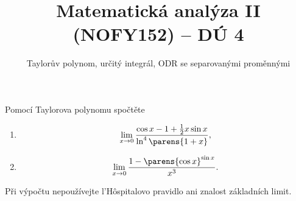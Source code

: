 \documentclass[answers]{exam}
\title{\vspace{-3ex}Matematická analýza II (NOFY152) – DÚ 4}
\author{Taylorův polynom, určitý integrál, ODR se separovanými proměnnými}
\date{\vspace{-5ex}}
\begin{document}
\maketitle

\begin{questions}
  \question Pomocí Taylorova polynomu spočtěte
	\begin{enumerate}[label=(\roman*)]
		\item
		  \begin{equation*}
		    \lim_{x \to 0}
		    \frac{\cos x - 1 + \frac{1}{2} x \sin x}{\ln^4 \parens{1 + x}},
		  \end{equation*}
		\item
		  \begin{equation*}
		    \lim_{x \to 0}
		    \frac{1 - \parens{\cos x}^{\sin x}}{x^3}.
		  \end{equation*}
	\end{enumerate}

  Při výpočtu nepoužívejte l'H\^{o}spitalovo pravidlo ani znalost základních limit.
  

\end{questions}
\end{document}
